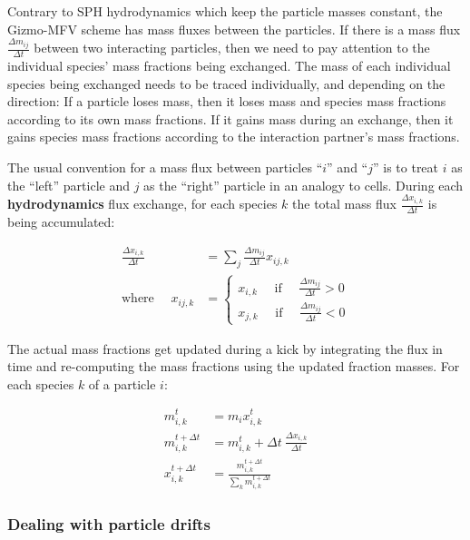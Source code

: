 Contrary to SPH hydrodynamics which keep the particle masses constant, the
Gizmo-MFV scheme has mass fluxes between the particles. If there is a mass flux $\frac{\Delta m_{ij}}{\Delta t}$ between two interacting particles, then we need to pay attention to the individual species' mass fractions being exchanged.
The mass of each individual species being exchanged needs to be traced individually, and depending on the direction: If a particle loses mass, then it loses mass and species mass fractions according to its own mass fractions. If it gains mass during an exchange, then it gains species mass fractions according to the interaction partner's mass fractions.

The usual convention for a mass flux between particles ``$i$'' and ``$j$'' is to treat $i$ as the ``left'' particle and $j$ as the ``right'' particle in an analogy to cells. During each \textbf{hydrodynamics} flux exchange, for each species $k$ the total mass flux $\frac{\Delta x_{i,k}}{\Delta t}$ is being accumulated:

\begin{align}
\frac{\Delta x_{i,k}}{\Delta t} &= \sum_j \frac{\Delta m_{ij}}{\Delta t} x_{ij,k}\\
\text{where }\quad x_{ij,k} &=
	\begin{cases}
		x_{i,k} \quad \text{ if } \quad \frac{\Delta m_{ij}}{\Delta t} > 0 \\
		x_{j,k} \quad \text{ if } \quad \frac{\Delta m_{ij}}{\Delta t} < 0
	\end{cases}
\end{align}


The actual mass fractions get updated during a kick by integrating the flux in time and re-computing the mass fractions using the updated fraction masses. For each species $k$ of a particle $i$:

\begin{align}
m_{i,k}^{t} &= m_i  x_{i,k}^{t} \\
m_{i,k}^{t + \Delta t} &= m_{i,k}^{t}  + \Delta t \ \frac{\Delta x_{i,k}}{\Delta t} \\
x_{i,k}^{t + \Delta t} &= \frac{m_{i,k}^{t + \Delta t}}{\sum_k m_{i,k}^{t + \Delta t}}
\end{align}







\subsubsection{Dealing with particle drifts}


